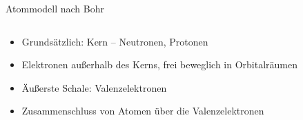 \documentclass[12pt%
,aspectratio=169%
]{beamer}
\begin{document}
\begin{frame}{Atommodell nach Bohr}
\begin{columns}[T] %
\begin{column}{.48\textwidth}
\begin{itemize}
	\item Grundsätzlich: Kern -- Neutronen, Protonen
	\item Elektronen außerhalb des Kerns, frei beweglich in Orbitalräumen
	\item Äußerste Schale: Valenzelektronen
	\item Zusammenschluss von Atomen über die Valenzelektronen
\end{itemize}
\end{column}%
\hfill%
\begin{column}{.48\textwidth}
\end{column}%
\end{columns}
\end{frame}
\end{document}
